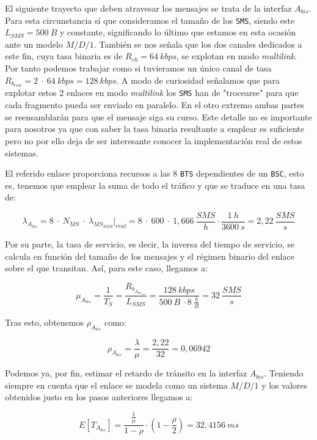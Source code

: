\documentclass[10pt]{article}
\begin{document}
			El siguiente trayecto que deben atravesar los mensajes se trata de la interfaz $A_{bis}$. Para esta circunstancia sí que consideramos el tamaño de los \texttt{SMS}, siendo este $L_{SMS} = 500\ B$ y constante, significando lo último que estamos en esta ocasión ante un modelo $M/D/1$. También se nos señala que los dos canales dedicados a este fin, cuya tasa binaria es de $R_{ch} = 64\ kbps$, se explotan en modo \textit{multilink}. Por tanto podemos trabajar como si tuvieramos un único canal de tasa $R_{b_{real}} = 2\ \cdot\ 64\ kbps = 128\ kbps$. A modo de curiosidad señalamos que para explotar estos $2$ enlaces en modo \textit{multilink} los \texttt{SMS} han de "trocearse" para que cada fragmento pueda ser enviado en paralelo. En el otro extremo ambas partes se reensamblarán para que el mensaje siga su curso. Este detalle no es importante para nosotros ya que con saber la tasa binaria resultante a emplear es suficiente pero no por ello deja de ser interesante conocer la implementación real de estos sistemas.

			El referido enlace proporciona recursos a las $8$ \texttt{BTS} dependientes de un \texttt{BSC}, esto es, tenemos que emplear la suma de todo el tráfico y que se traduce en una tasa de:

			$$\lambda_{A_{bis}} = 8\ \cdot\ N_{MS}\ \cdot\ \lambda_{MS_{SMS}}\biggr\rvert_{real} = 8\ \cdot\ 600\ \cdot\ 1,666\ \frac{SMS}{h} \cdot \frac{1\ h}{3600\ s} = 2,22\ \frac{SMS}{s}$$

			Por su parte, la tasa de servicio, es decir, la inversa del tiempo de servicio, se calcula en función del tamaño de los mensajes y el régimen binario del enlace sobre el que transitan. Así, para este caso, llegamos a:

			$$\mu_{A_{bis}} = \frac{1}{T_{S}} = \frac{R_{b_{A_{bis_{real}}}}}{L_{SMS}} = \frac{128\ kbps}{500\ B\ \cdot 8\ \frac{b}{B}} = 32\ \frac{SMS}{s}$$

			Tras esto, obtenemos $\rho_{A_{bis}}$ como:

			$$\rho_{A_{bis}} = \frac{\lambda}{\mu} = \frac{2,22}{32} = 0,06942$$

			Podemos ya, por fin, estimar el retardo de tránsito en la interfaz $A_{bis}$. Teniendo siempre en cuenta que el enlace se modela como un sistema $M/D/1$ y los valores obtenidos justo en los pasos anteriores llegamos a:

			$$E[T_{A_{bis}}] = \frac{\frac{1}{\mu}}{1 - \rho} \cdot (1 - \frac{\rho}{2}) = 32,4156\ ms$$
			
\end{document}
